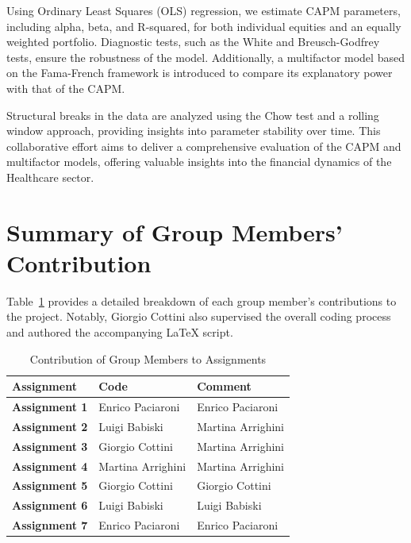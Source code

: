 \documentclass[12pt, openright, oneside]{report}
\begin{document}
Using Ordinary Least Squares (OLS) regression, we estimate CAPM parameters, including alpha, beta, and R-squared, for both 
individual equities and an equally weighted portfolio. Diagnostic tests, such as the White and Breusch-Godfrey tests, ensure 
the robustness of the model. Additionally, a multifactor model based on the Fama-French framework is introduced to compare its
explanatory power with that of the CAPM.

Structural breaks in the data are analyzed using the Chow test and a rolling window approach, providing insights into 
parameter stability over time. This collaborative effort aims to deliver a comprehensive evaluation of the CAPM and 
multifactor models, offering valuable insights into the financial dynamics of the Healthcare sector.

\clearpage
\section*{Summary of Group Members' Contribution}

Table~\ref{tab:group_contribution} provides a detailed breakdown of each group member's contributions to the project. 
Notably, Giorgio Cottini also supervised the overall coding process and authored the accompanying LaTeX script.\\
\vspace{2cm}
\begin{table}[ht!]
    \centering
    \renewcommand{\arraystretch}{1.6} %
    \begin{tabular}{|p{}|p{}|p{}|}
        \hline
        \rowcolor{unired!40} \textbf{Assignment} & \textbf{Code}              & \textbf{Comment}         \\ \hline
        \textbf{Assignment 1}        & Enrico Paciaroni          & Enrico Paciaroni         \\ \hline
        \rowcolor{gray!10} \textbf{Assignment 2}        & Luigi Babiski             & Martina Arrighini        \\ \hline
        \textbf{Assignment 3}        & Giorgio Cottini           & Martina Arrighini        \\ \hline
        \rowcolor{gray!10} \textbf{Assignment 4}        & Martina Arrighini         & Martina Arrighini        \\ \hline
        \textbf{Assignment 5}        & Giorgio Cottini           & Giorgio Cottini          \\ \hline
        \rowcolor{gray!10} \textbf{Assignment 6}       & Luigi Babiski             & Luigi Babiski            \\ \hline
        \textbf{Assignment 7}        & Enrico Paciaroni          & Enrico Paciaroni         \\ \hline
    \end{tabular}
    \caption{Contribution of Group Members to Assignments}
    \label{tab:group_contribution}
\end{table}
\end{document}
